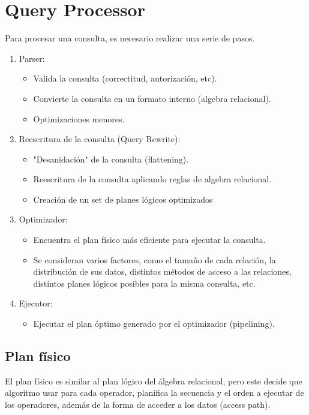 \section{Query Processor}
Para procesar una consulta, es necesario realizar una serie de pasos.
\begin{enumerate}
  \item Parser:
  \begin{itemize}
    \item Valida la consulta (correctitud, autorización, etc).
    \item Convierte la consulta en un formato interno (algebra relacional).
    \item Optimizaciones menores.
  \end{itemize}
  \item Reescritura de la consulta (Query Rewrite):
  \begin{itemize}
    \item "Desanidación" de la consulta (flattening).
    \item Reescritura de la consulta aplicando reglas de algebra relacional.
    \item Creación de un set de planes lógicos optimizados
  \end{itemize}
  \item Optimizador:
  \begin{itemize}
    \item Encuentra el plan físico más eficiente para ejecutar la consulta.
    \item Se consideran varios factores, como el tamaño de cada relación, la distribución de sus datos, distintos métodos de acceso a las relaciones, distintos planes lógicos posibles para la misma consulta, etc.
  \end{itemize}
  \item Ejecutor:
  \begin{itemize}
    \item Ejecutar el plan óptimo generado por el optimizador (pipelining).
  \end{itemize}
\end{enumerate}

\subsection{Plan físico}
El plan físico es similar al plan lógico del álgebra relacional, pero este decide que algoritmo usar para cada operador, planifica la secuencia y el orden a ejecutar de los operadores, además de la forma de acceder a los datos (access path).

